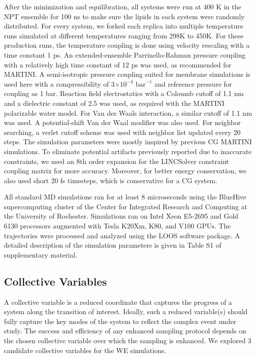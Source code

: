 \documentclass{biophys-new}
\begin{document}
After the minimization and equilibration, all systems were run at 400 K in the NPT ensemble for 100 ns to make sure the lipids in each system were randomly distributed.
For every system, we forked each replica into multiple temperature runs simulated at different temperatures ranging from 298K to 450K.
For these production runs, the temperature coupling is done using velocity rescaling\cite{Bussi2007} with a time constant 1 ps.
An extended-ensemble Parrinello-Rahman pressure coupling\cite{Parrinello1981} with a relatively high time constant of 12 ps was used, as recommended for MARTINI.  A semi-isotropic pressure coupling suited for membrane simulations is used here with a compressibility of 3$\times 10^{-4}$ $\text{bar}^{-1}$ and reference pressure for coupling as 1 bar.
Reaction field electrostatics with a Coloumb cutoff of 1.1 nm and a dielectric constant of 2.5 was used, as required with the MARTINI polarizable water model.
For Van der Waals interaction, a similar cutoff of 1.1 nm was used.
A potential-shift Van der Waal modifier was also used.
For neighbor searching, a verlet cutoff scheme was used with neighbor list updated every 20 steps.
The simulation parameters were mostly inspired by previous CG MARTINI simulations\cite{DeJong2016}.
To eliminate potential artifacts previously reported due to inaccurate constraints\cite{Javanainen2020}, we used an 8th order expansion for the LINCSolver constraint coupling matrix\cite{Hess1997} for more accuracy.
Moreover, for better energy conservation, we also used short 20 fs timesteps, which is conservative for a CG system.

All standard MD simulations ran for at least 8 microseconds using the BlueHive supercomputing cluster of the Center for Integrated Research and Computing at the University of Rochester.
Simulations ran on Intel Xeon E5-2695 and Gold 6130 processors augmented with Tesla K20Xm, K80, and V100 GPUs.
The trajectories were processed and analyzed using the LOOS software package\cite{Romo2014}.
A detailed description of the simulation parameters is given in Table S1 of supplementary material.

\subsection*{Collective Variables}

A collective variable is a reduced coordinate that captures the progress of a system along the transition of interest.
Ideally, such a reduced variable(s) should fully capture the key modes of the system to reflect the complex event under study.
The success and efficiency of any enhanced sampling protocol depends on the chosen collective variable over which the sampling is enhanced\cite{Valsson2016, Yang2019b, Henin2022}.
We explored 3 candidate collective variables for the WE simulations.
\end{document}

